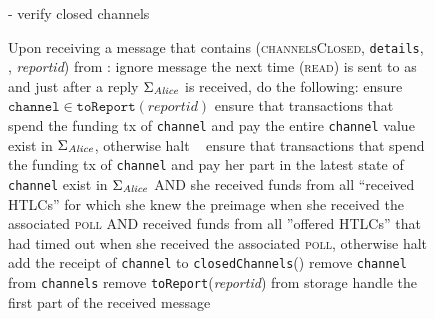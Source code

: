   \begin{figure}[H]
    \begin{systembox}{\fpaynet - verify closed channels}
      \begin{algorithmic}[1]
        \State {}
        \State Upon receiving a message that contains (\textsc{channelsClosed},
        \texttt{details}, \alice, \textit{reportid}) from \simulator:
        \Indent
            \State ignore message
          \EndIf
          \State the next time (\textsc{read}) is sent to \ledger{} as \alice{}
          and just after a reply $\Sigma_{\mathit{Alice}}$ is received, do the
          following:
          \Indent
             \State ensure
            $\mathtt{channel} \in
            \mathtt{toReport}\left(\mathit{reportid}\right)$
                \State ensure that transactions that spend the funding tx of
                \texttt{channel} and pay \alice{} the entire \texttt{channel}
                value exist in $\Sigma_{\mathit{Alice}}$, otherwise halt
              \Else \  \State
              ensure that transactions that spend the funding tx of
              \texttt{channel} and pay \alice{} her part in the latest state of
              \texttt{channel} exist in $\Sigma_{\mathit{Alice}}$ AND she received funds
              from all ``received HTLCs'' for which she knew the preimage when
              she received the associated \textsc{poll} AND received funds from
              all ''offered HTLCs'' that had timed out when she received the
              associated \textsc{poll}, otherwise halt
              \EndIf
              \State add the receipt of \texttt{channel} to
              \texttt{closedChannels}(\alice)
              \State remove \texttt{channel} from \texttt{channels}
            \EndFor
            \State remove \texttt{toReport}(\textit{reportid}) from storage
          \EndIndent
          \State handle the first part of the received message
        \EndIndent
      \end{algorithmic}
    \end{systembox}
    \caption{}
    \label{alg:fpaynet:verifyclosed}
  \end{figure}

